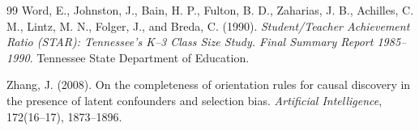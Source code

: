 \documentclass[11pt,a4paper,oneside]{report}
\begin{document}
\begin{thebibliography}{99}
Word, E., Johnston, J., Bain, H. P., Fulton, B. D., Zaharias, J. B.,
Achilles, C. M., Lintz, M. N., Folger, J., and Breda, C. (1990).
\textit{Student/Teacher Achievement Ratio (STAR): Tennessee's K--3 Class
Size Study. Final Summary Report 1985--1990}.
Tennessee State Department of Education.

Zhang, J. (2008).
On the completeness of orientation rules for causal discovery in the
presence of latent confounders and selection bias.
\textit{Artificial Intelligence}, 172(16--17), 1873--1896.

\end{thebibliography}
\end{document}
